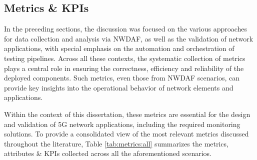 
\subsection{Metrics \& KPIs}
\label{sec:testingandvalidation:metrics}

In the preceding sections, the discussion was focused on the various approaches for data collection and analysis via \acs{NWDAF}, as well as the validation of network applications, with special emphasis on the automation and orchestration of testing pipelines. Across all these contexts, the systematic collection of metrics plays a central role in ensuring the correctness, efficiency and reliability of the deployed components. Such metrics, even those from \acs{NWDAF} scenarios, can provide key insights into the operational behavior of network elements and applications.

Within the context of this dissertation, these metrics are essential for the design and validation of \acs{5G} network applications, including the required monitoring solutions. To provide a consolidated view of the most relevant metrics discussed throughout the literature, Table \ref{tab:metrics:all} summarizes the metrics, attributes \& \acsp{KPI} collected across all the aforementioned scenarios.

